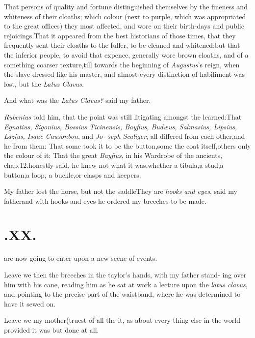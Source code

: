 \documentclass{article}
\begin{document}
\tsh That persons of quality and fortune distinguished
themselves by the fineness and whiteness of their cloaths; which
colour (next to purple, which was appropriated to the great
offices) they most affected, and wore on their
birth-days and
public rejoicings.\tsh That it appeared from the best
historians of those times, that they frequently sent their cloaths
to the fuller, to be cleaned and whitened:\tsh but
that the inferior people, to avoid that expence, generally wore
brown cloaths, and of a something coarser texture,\tsk till
towards the beginning of \textit{Augustus}’s reign, when the
slave dressed like his master, and almost every distinction of
habiliment was lost, but the \textit{Latus Clavus.}

And what was the \textit{Latus Clavus?} said my father.

\textit{Rubenius} told him, that the point was still litigating
amongst the learned:\tsh That \textit{Egnatius, Sigonius,
Bossius Tici\-nensis, Bayfius, Budæus, Salmasius, Lipsius,
Lazius, Isaac Causonbon}, and \textit{Jo- seph Scaliger}, all
differed from each other,\tsk and he from them: That some took it
to be the button,\tsk some the coat itself,\tsk others only the
colour of it:\tsk\break
That the great \textit{Bayfius}, in his Wardrobe\break
of the ancients, chap.\@ 12.\tsk honestly\break
said, he knew not what it was,\tsk whether\break
a tibula,\tsk a stud,\tsk a button,\tsk a loop,\tsk\break
a buckle,\tsk or clasps and keepers.\tsh

\tsh My father lost the horse, but not the
saddle\tsh They are \textit{hooks and eyes}, said my
father\tsh and with hooks and eyes he ordered my breeches
to be made.

\section{.\enspace XX.}

 are now going to enter upon a new
scene of events.\tsh

\tsh Leave we then the breeches in the taylor’s
hands, with my father stand- ing over him with his cane, reading him
as he sat at work a lecture upon the \textit{latus clavus}, and
pointing to the precise part of the waistband, where he was
determined to have it sewed on.\tsh

Leave we my mother\tsk (truest of all the\break
{}\break
it, as about every thing else in the world
\tsk provided it was but done at all.\tsh
\end{document}
